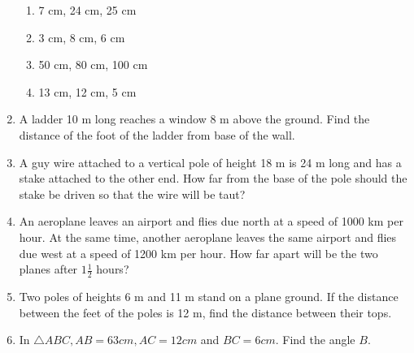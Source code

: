 \begin{enumerate}[label=\arabic*.,ref=\thesubsection.\theenumi]
\begin{enumerate}
\item  7 cm, 24 cm, 25 cm 
\item  3 cm, 8 cm, 6 cm 
\item  50 cm, 80 cm, 100 cm 
\item  13 cm, 12 cm, 5 cm
\end{enumerate}
\item  A ladder 10 m long reaches a window 8 m above the ground. Find the distance of the foot of the ladder from base of the wall.
\item  A guy wire attached to a vertical pole of height 18 m is 24 m long and has a stake attached to the other end. How far from the base of the pole should the stake be driven so that the wire will be taut?
\item  An aeroplane leaves an airport and flies due north at a speed of 1000 km per hour. At the same time, another aeroplane leaves the same airport and flies due west at a speed of 1200 km per hour. How far apart will be the two planes after $1\frac{1}{2}$ hours?
\item  Two poles of heights 6 m and 11 m stand on a plane ground. If the distance between the feet of the poles is 12 m, find the distance between their tops.
\item  In  $\triangle  ABC, AB = 6 3 cm, AC = 12 cm$ and $BC = 6 cm$. Find the angle $B$.

\end{enumerate}
%

